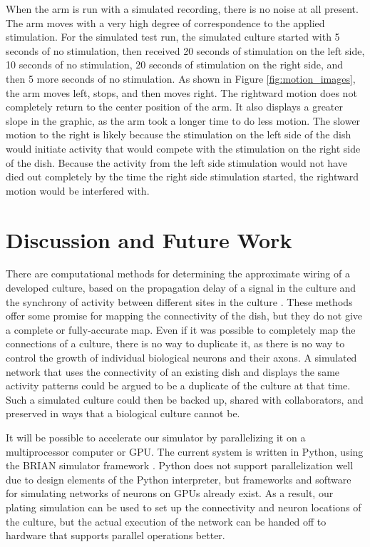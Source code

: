 \documentclass[letterpaper]{article}
\begin{document}
When the arm is run with a simulated recording, there is no noise at all present. 
The arm moves with a very high degree of correspondence to the applied stimulation. 
For the simulated test run, the simulated culture started with 5 seconds of no stimulation, then received 20 seconds of stimulation on the left side, 10 seconds of no stimulation, 20 seconds of stimulation on the right side, and then 5 more seconds of no stimulation. 
As shown in Figure \ref{fig:motion_images}, the arm moves left, stops, and then moves right. 
The rightward motion does not completely return to the center position of the arm. 
It also displays a greater slope in the graphic, as the arm took a longer time to do less motion.
The slower motion to the right is likely because the stimulation on the left side of the dish would initiate activity that would compete with the stimulation on the right side of the dish.
Because the activity from the left side stimulation would not have died out completely by the time the right side stimulation started, the rightward motion would be interfered with. 

\section{Discussion and Future Work}

There are computational methods for determining the approximate wiring of a developed culture, based on the propagation delay of a signal in the culture and the synchrony of activity between different sites in the culture  \cite{erickson2008caged,esposti2008estimation}. 
These methods offer some promise for mapping the connectivity of the dish, but they do not give a complete or fully-accurate map. 
Even if it was possible to completely map the connections of a culture, there is no way to duplicate it, as there is no way to control the growth of individual biological neurons and their axons. 
A simulated network that uses the connectivity of an existing dish and displays the same activity patterns could be argued to be a duplicate of the culture at that time. 
Such a simulated culture could then be backed up, shared with collaborators, and preserved in ways that a biological culture cannot be. 

It will be possible to accelerate our simulator by parallelizing it on a multiprocessor computer or GPU.
The current system is written in Python, using the BRIAN simulator framework \cite{goodman2008brian}. 
Python does not support parallelization well due to design elements of the Python interpreter, but frameworks and software for simulating networks of neurons on GPUs already exist. 
As a result, our plating simulation can be used to set up the connectivity and neuron locations of the culture, but the actual execution of the network can be handed off to hardware that supports parallel operations better. 
\end{document}
